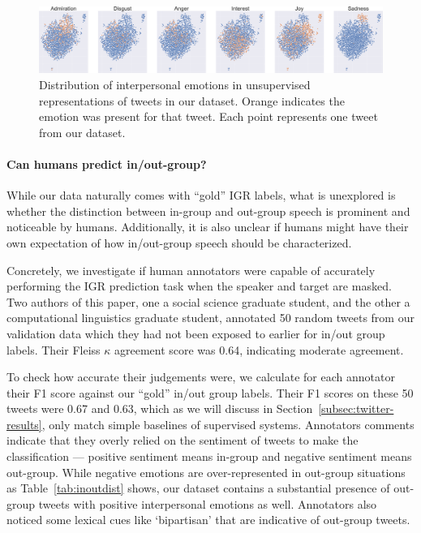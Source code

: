 \begin{figure}[t]
    \centering
    \includegraphics[width=\linewidth]{figures/bt_emots.png}
    \caption{Distribution of interpersonal emotions in unsupervised representations of tweets in our dataset. Orange indicates the emotion was present for that tweet. Each point represents one tweet from our dataset.}
    \label{fig:domainclus}
\end{figure}

\paragraph{Can humans predict in/out-group?}

While our data naturally comes with ``gold'' IGR labels, what is unexplored is whether the distinction between in-group and out-group speech is prominent and noticeable by humans. Additionally, it is also unclear if humans might have their own expectation of how in/out-group speech should be characterized.

Concretely, we investigate if human annotators were capable of accurately performing the IGR prediction task when the speaker and target are masked. Two authors of this paper, one a social science graduate student, and the other a computational linguistics graduate student, annotated 50 random tweets from our validation data which they had not been exposed to earlier for in/out group labels. Their Fleiss $\kappa$ agreement score was 0.64, indicating moderate agreement.

To check how accurate their judgements were, we calculate for each annotator their F1 score against our ``gold'' in/out group labels. Their F1 scores on these 50 tweets were 0.67 and 0.63, which as we will discuss in Section~\ref{subsec:twitter-results}, only match simple baselines of supervised systems. Annotators comments indicate that they overly relied on the sentiment of tweets to make the classification --- positive sentiment means in-group and negative sentiment means out-group. While negative emotions are over-represented in out-group situations as Table~\ref{tab:inoutdist} shows, our dataset contains a substantial presence of out-group tweets with positive interpersonal emotions as well. Annotators also noticed some lexical cues like `bipartisan' that are indicative of out-group tweets.


